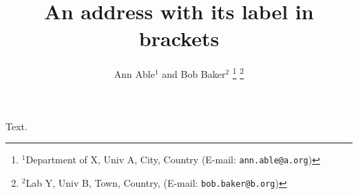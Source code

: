 \documentclass{article}
\begin{document}
\title{An address with its label in brackets}
\author{Ann Able$^{1}$ and Bob Baker$^{2}$%
\thanks{$^{1}$Department of X, Univ A, City, Country (E-mail: \texttt{ann.able@a.org})}%
\thanks{$^{2}$Lab Y, Univ B, Town, Country, (E-mail: \texttt{bob.baker@b.org})}}
\maketitle
Text.
\end{document}
